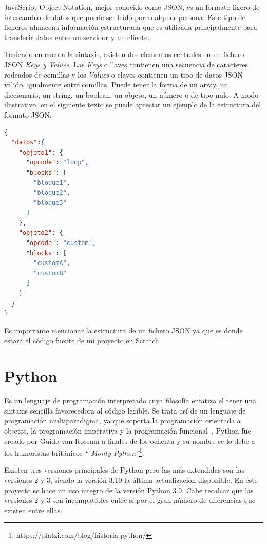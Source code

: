 \documentclass[a4paper, 12pt]{book}
\begin{document}
JavaScript Object Notation, mejor conocido como JSON, es un formato ligero de intercambio de datos que puede ser leído por cualquier persona. Este tipo de ficheros almacena información estructurada que es utilizada principalmente para transferir datos entre un servidor y un cliente\cite{jsonWeb}.

Teniendo en cuenta la sintaxis, existen dos elementos centrales en un fichero JSON \textit{Keys y Values}. Las \textit{Keys} o llaves contienen una secuencia de caracteres rodeados de comillas y los \textit{Values} o claves contienen un tipo de datos JSON válido, igualmente entre comillas. Puede tener la forma de un array, un diccionario, un string, un boolean, un objeto, un número o de tipo nulo. A modo ilustrativo, en el siguiente texto se puede apreciar un ejemplo de la estructura del formato JSON: %

\begin{lstlisting}[language=json]
{
  "datos":{
    "objeto1": {
      "opcode": "loop",
      "blocks": [
        "bloque1", 
        "bloque2",
        "bloque3"
      ]
    },
    "objeto2": {
      "opcode": "custom",
      "blocks": [
        "customA", 
        "customB"
      ]
    }
  }
}
\end{lstlisting}

Es importante mencionar la estructura de un fichero JSON ya que es donde estará el código fuente de mi proyecto en Scratch.

\section{Python}
\label{sec:Python}

Es un lenguaje de programación interpretado cuya filosofía enfatiza el tener una sintaxis sencilla favorecedora al código legible. Se trata así de un lenguaje de programación multiparadigma, ya que soporta la programación orientada a objetos, la programación imperativa y la programación funcional~\cite{pythonWeb}. Python fue creado por Guido van Rossum a finales de los ochenta y su nombre se lo debe a los humoristas británicos \textit{`` Monty Python''}\footnote{https://platzi.com/blog/historia-python/}.

Existen tres versiones principales de Python pero las más extendidas son las versiones 2 y 3, siendo la versión 3.10 la última actualización disponible. En este proyecto se hace un uso íntegro de la versión Python 3.9. Cabe recalcar que las versiones 2 y 3 son incompatibles entre sí por el gran número de diferencias que existen entre ellas.
\end{document}
